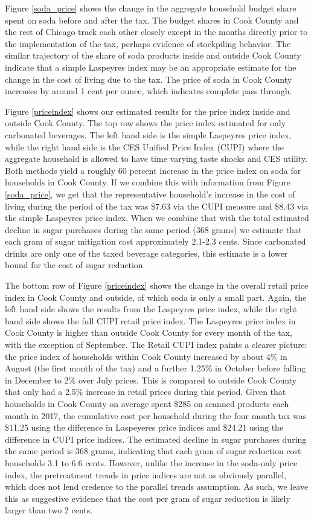 \documentclass[12pt]{article}
\begin{document}
Figure \ref{soda_price} shows the change in the aggregate household budget share spent on soda before and after the tax. The budget shares in Cook County and the rest of Chicago track each other closely except in the months directly prior to the implementation of the tax, perhaps evidence of stockpiling behavior. The similar trajectory of the share of soda products inside and outside Cook County indicate that a simple Laspeyres index may be an appropriate estimate for the change in the cost of living due to the tax. The price of soda in Cook County increases by around 1 cent per ounce, which indicates complete pass through.

Figure \ref{priceindex} shows our estimated results for the price index inside and outside Cook County. The top row shows the price index estimated for only carbonated beverages. The left hand side is the simple Laspeyres price index, while the right hand side is the CES Unified Price Index (CUPI) where the aggregate household is allowed to have time varying taste shocks and CES utility. Both methods yield a roughly 60 percent increase in the price index on soda for households in Cook County. If we combine this with information from Figure \ref{soda_price}, we get that the representative household's increase in the cost of living during the period of the tax was \$7.63 via the CUPI measure and \$8.43 via the simple Laspeyres price index. When we combine that with the total estimated decline in sugar purchases during the same period (368 grams) we estimate that each gram of sugar mitigation cost approximately 2.1-2.3 cents. Since carbonated drinks are only one of the taxed beverage categories, this estimate is a lower bound for the cost of sugar reduction.

The bottom row of Figure \ref{priceindex} shows the change in the overall retail price index in Cook County and outside, of which soda is only a small part. Again, the left hand side shows the results from the Laspeyres price index, while the right hand side shows the full CUPI retail price index. The Laspeyres price index in Cook County is higher than outside Cook County for every month of the tax, with the exception of September. The Retail CUPI index paints a clearer picture: the price index of households within Cook County increased by about 4\% in August (the first month of the tax) and a further 1.25\% in October before falling in December to 2\% over July prices. This is compared to outside Cook County that only had a 2.5\% increase in retail prices during this period. Given that households in Cook County on average spent \$285 on scanned products each month in 2017, the cumulative cost per household during the four month tax was \$11.25 using the difference in Laspeyeres price indices and \$24.21 using the difference in CUPI price indices. The estimated decline in sugar purchases during the same period is 368 grams, indicating that each gram of sugar reduction cost households 3.1 to 6.6 cents. However, unlike the increase in the soda-only price index, the pretreatment trends in price indices are not as obviously parallel, which does not lend credence to the parallel trends assumption. As such, we leave this as suggestive evidence that the cost per gram of sugar reduction is likely larger than two 2 cents.
\end{document}
